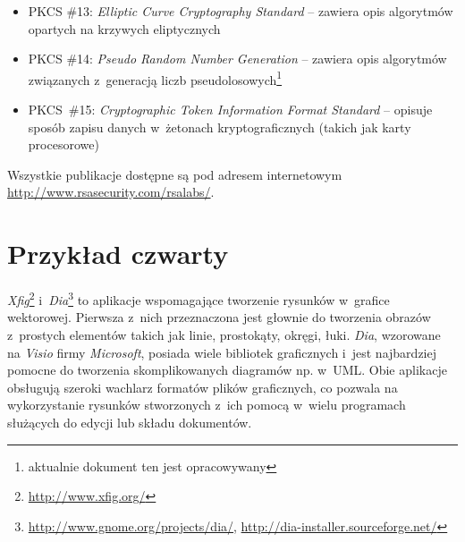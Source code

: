 \begin{itemize}
{    Standard} -- zawiera opis formatu zapisu danych kryptograficznych przez
    aplikacje
    \item PKCS \#13: {\em Elliptic Curve Cryptography Standard} -- zawiera
    opis algorytmów opartych na krzywych eliptycznych
    \item PKCS \#14: {\em Pseudo Random Number Generation} -- zawiera
    opis algorytmów związanych z~generacją liczb
    pseudolosowych\footnote{aktualnie dokument ten jest opracowywany}
    \item PKCS~\#15: {\em Cryptographic Token Information Format
    Standard} -- opisuje sposób zapisu danych w~żetonach kryptograficznych
    (takich jak karty procesorowe)
\end{itemize}

Wszystkie publikacje dostępne są pod adresem internetowym
\url{http://www.rsasecurity.com/rsalabs/}.

\section{Przykład czwarty}

{\it Xfig}\footnote{\url{http://www.xfig.org/}}
i~{\it Dia}\footnote{\url{http://www.gnome.org/projects/dia/},
\url{http://dia-installer.sourceforge.net/}}
to aplikacje wspomagające tworzenie rysunków w~grafice wektorowej.
Pierwsza z~nich przeznaczona jest głownie do tworzenia obrazów
z~prostych elementów takich jak linie, prostokąty, okręgi, łuki.
{\it Dia}, wzorowane na {\it Visio} firmy {\it Microsoft}, posiada
wiele bibliotek graficznych i~jest najbardziej pomocne do
tworzenia skomplikowanych diagramów np. w~UML. Obie aplikacje obsługują
szeroki wachlarz formatów plików graficznych, co pozwala na wykorzystanie
rysunków stworzonych z~ich pomocą w~wielu programach służących do edycji
lub składu dokumentów.

